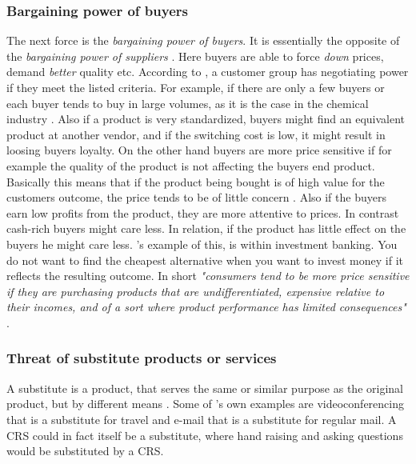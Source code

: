 \subsubsection*{Bargaining power of buyers}
The next force is the \emph{bargaining power of buyers}. It is essentially the opposite of the \emph{bargaining power of suppliers} \cite[p.~83]{porter2008five}. Here buyers are able to force \emph{down} prices, demand \emph{better} quality etc. According to , a customer group has negotiating power if they meet the listed criteria. For example, if there are only a few buyers or each buyer tends to buy in large volumes, as it is the case in the chemical industry \cite[p.~83]{porter2008five}. Also if a product is very standardized, buyers might find an equivalent product at another vendor, and if the switching cost is low, it might result in loosing buyers loyalty. 
On the other hand buyers are more price sensitive if for example the quality of the product is not affecting the buyers end product. Basically this means that if the product being bought is of high value for the customers outcome, the price tends to be of little concern \cite[p.~84]{porter2008five}. Also if the buyers earn low profits from the product, they are more attentive to prices. In contrast cash-rich buyers might care less. In relation, if the product has little effect on the buyers he might care less. 's example of this, is within investment banking. You do not want to find the cheapest alternative when you want to invest money if it reflects the resulting outcome. In short \emph{"consumers tend to be more price sensitive if they are purchasing products that are undifferentiated, expensive relative to their incomes, and of a sort where product performance has limited consequences"} \cite[p.~84]{porter2008five}.

\subsubsection*{Threat of substitute products or services}
A substitute is a product, that serves the same or similar purpose as the original product, but by different means \cite[p.~84]{porter2008five}. Some of 's own examples are videoconferencing that is a substitute for travel and e-mail that is a substitute for regular mail. A CRS could in fact itself be a substitute, where hand raising and asking questions would be substituted by a CRS. 


